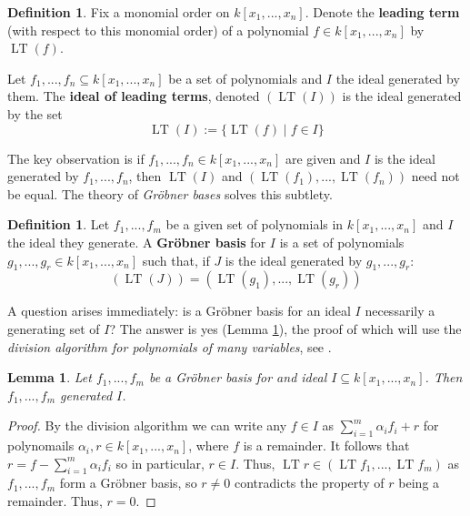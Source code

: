 \documentclass[12pt]{article}
\theoremstyle{plain}
\newtheorem{lemma}[thm]{Lemma}
\theoremstyle{definition}
\newtheorem{defn}[thm]{Definition} %
\begin{document}
\begin{defn}
Fix a monomial order on $k[x_1,...,x_n]$. Denote the \textbf{leading term} (with respect to this monomial order) of a polynomial $f \in k[x_1,...,x_n]$ by $\operatorname{LT}(f)$.

Let $f_1,...,f_n \subseteq k[x_1,...,x_n]$ be a set of polynomials and $I$ the ideal generated by them. The \textbf{ideal of leading terms}, denoted $(\operatorname{LT}(I))$ is the ideal generated by the set
\begin{equation}
    \operatorname{LT}(I) := \lbrace \operatorname{LT}(f) \mid f \in I\rbrace
\end{equation}
\end{defn}
The key observation is if $f_1,...,f_n  \in k[x_1,...,x_n]$ are given and $I$ is the ideal generated by $f_1,...,f_n$, then $\operatorname{LT}(I)$ and $(\operatorname{LT}(f_1),...,\operatorname{LT}(f_n))$ need not be equal. The theory of \emph{Gr\"{o}bner bases} solves this subtlety.
\begin{defn}
Let $f_1,...,f_m$ be a given set of polynomials in $k[x_1,...,x_n]$ and $I$ the ideal they generate. A \textbf{Gr\"{o}bner basis} for $I$ is a set of polynomials $g_1,...,g_r \in k[x_1,...,x_n]$ such that, if $J$ is the ideal generated by $g_1,...,g_r$:
\begin{equation}
    (\operatorname{LT}(J)) = (\operatorname{LT}(g_1),...,\operatorname{LT}(g_r))
\end{equation}
\end{defn}
A question arises immediately: is a Gr\"{o}bner basis for an ideal $I$ necessarily a generating set of $I$? The answer is yes (Lemma \ref{lem:Grobner_is_basis}), the proof of which will use the \emph{division algorithm for polynomials of many variables}, see \cite[\S 2. 3 Theorem 3]{grobner}.
\begin{lemma}\label{lem:Grobner_is_basis}
Let $f_1,...,f_m$ be a Gr\"{o}bner basis for and ideal $I \subseteq k[x_1,...,x_n]$. Then $f_1,...,f_m$ generated $I$.
\end{lemma}
\begin{proof}
By the division algorithm we can write any $f \in I$ as $\sum_{i = 1}^m \alpha_i f_i + r$ for polynomails $\alpha_i,r \in k[x_1,...,x_n]$, where $f$ is a remainder. It follows that $r = f - \sum_{i = 1}^m \alpha_i f_i$ so in particular, $r \in I$. Thus, $\operatorname{LT}r \in (\operatorname{LT}f_1,...,\operatorname{LT}f_m)$ as $f_1,...,f_m$ form a Gr\"{o}bner basis, so $r \neq 0$ contradicts the property of $r$ being a remainder. Thus, $r = 0$.
\end{proof}
\end{document}
